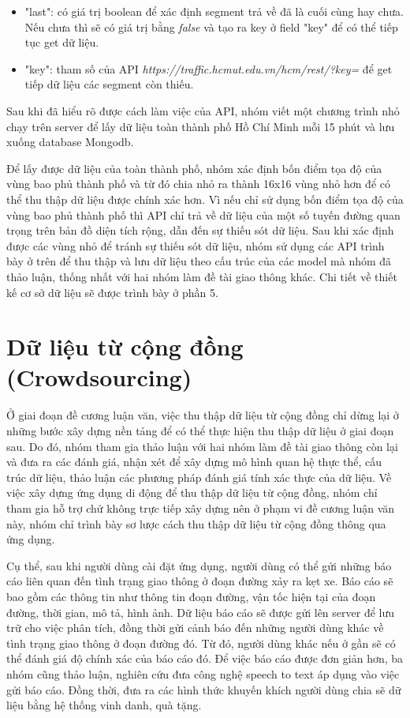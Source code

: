 \begin{itemize}
\begin{itemize}
    \item "last": có giá trị boolean để xác định segment trả về đã là cuối cùng hay chưa. Nếu chưa thì sẽ có giá trị bằng \textit{false} và tạo ra key ở field "key" để có thể tiếp tục get dữ liệu.
    \item "key": tham số của API \textit{https://traffic.hcmut.edu.vn/hcm/rest/?key=} để get tiếp dữ liệu các segment còn thiếu.
    \end{itemize}
\end{itemize}
Sau khi đã hiểu rõ được cách làm việc của API, nhóm viết một chương trình nhỏ chạy trên server để lấy dữ liệu toàn thành phố Hồ Chí Minh mỗi 15 phút và lưu xuống database Mongodb.

Để lấy được dữ liệu của toàn thành phố, nhóm xác định bốn điểm tọa độ của vùng bao phủ thành phố và từ đó chia nhỏ ra thành 16x16 vùng nhỏ hơn để có thể thu thập dữ liệu được chính xác hơn. Vì nếu chỉ sử dụng bốn điểm tọa độ của vùng bao phủ thành phố thì API chỉ trả về dữ liệu của một số tuyến đường quan trọng trên bản đồ diện tích rộng, dẫn đến sự thiếu sót dữ liệu. Sau khi xác định được các vùng nhỏ để tránh sự thiếu sót dữ liệu, nhóm sử dụng các API trình bày ở trên để thu thập và lưu dữ liệu theo cấu trúc của các model mà nhóm đã thảo luận, thống nhất với hai nhóm làm đề tài giao thông khác. Chi tiết về thiết kế cơ sở dữ liệu sẽ được trình bày ở phần 5.

\section{Dữ liệu từ cộng đồng (Crowdsourcing)}
Ở giai đoạn đề cương luận văn, việc thu thập dữ liệu từ cộng đồng chỉ dừng lại ở những bước xây dựng nền tảng để có thể thực hiện thu thập dữ liệu ở giai đoạn sau. Do đó, nhóm tham gia thảo luận với hai nhóm làm đề tài giao thông còn lại và đưa ra các đánh giá, nhận xét để xây dựng mô hình quan hệ thực thể, cấu trúc dữ liệu, thảo luận các phương pháp đánh giá tính xác thực của dữ liệu. Về việc xây dựng ứng dụng di động để thu thập dữ liệu từ cộng đồng, nhóm chỉ tham gia hỗ trợ chứ không trực tiếp xây dựng nên ở phạm vi đề cương luận văn này, nhóm chỉ trình bày sơ lược cách thu thập dữ liệu từ cộng đồng thông qua ứng dụng.

Cụ thể, sau khi người dùng cài đặt ứng dụng, người dùng có thể gửi những báo cáo liên quan đến tình trạng giao thông ở đoạn đường xảy ra kẹt xe. Báo cáo sẽ bao gồm các thông tin như thông tin đoạn đường, vận tốc hiện tại của đoạn đường, thời gian, mô tả, hình ảnh. Dữ liệu báo cáo sẽ được gửi lên server để lưu trữ cho việc phân tích, đồng thời gửi cảnh báo đến những người dùng khác về tình trạng giao thông ở đoạn đường đó. Từ đó, người dùng khác nếu ở gần sẽ có thể đánh giá độ chính xác của báo cáo đó. Để việc báo cáo được đơn giản hơn, ba nhóm cũng thảo luận, nghiên cứu đưa công nghệ speech to text áp dụng vào việc gửi báo cáo. Đồng thời, đưa ra các hình thức khuyến khích người dùng chia sẽ dữ liệu bằng hệ thống vinh danh, quà tặng.

